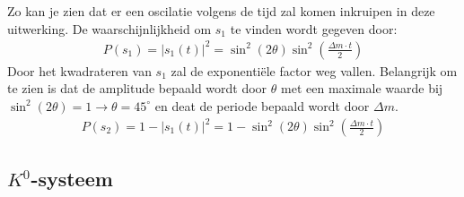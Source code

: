 \documentclass[../main.tex]{subfiles}
\begin{document}
Zo kan je zien dat er een oscilatie volgens de tijd zal komen inkruipen in deze uitwerking. De waarschijnlijkheid om $s_1$ te vinden wordt gegeven door:
\begin{equation}
    \begin{aligned}
        \label{eq:voorbeeld_osc_stable_massa_prob_1}
        P\left(s_{1}\right)=\left|s_{1}(t)\right|^{2}=\sin ^{2}(2 \theta) \sin ^{2}\left(\frac{\Delta m \cdot t}{2}\right)
    \end{aligned}
\end{equation}
Door het kwadrateren van $s_1$ zal de exponentiële factor weg vallen. Belangrijk om te zien is dat de amplitude bepaald wordt door $\theta$ met een maximale waarde bij $\sin^2(2\theta)=1 \rightarrow \theta=45^\circ$ en deat de periode bepaald wordt door $\Delta m$.
\begin{equation}
    \begin{aligned}
        \label{eq:voorbeeld_osc_stable_massa_prob_2}
        P\left(s_{2}\right)=1-\left|s_{1}(t)\right|^{2}=1-\sin ^{2}(2 \theta) \sin ^{2}\left(\frac{\Delta m \cdot t}{2}\right)
    \end{aligned}
\end{equation}

\subsection{$K^0$-systeem}%
\label{sub:_k_0_systeem}
\end{document}
